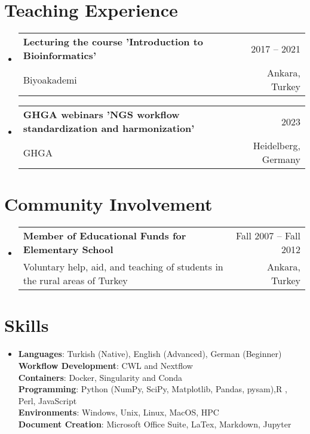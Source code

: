 \documentclass[A4,11pt]{article}
\makeatletter
\newcommand{\CVSubheading}[4]{
  \vspace{-2pt}\item
    \begin{tabular*}{0.97\textwidth}[t]{l@{\extracolsep{\fill}}r}
      \textbf{#1} & #2 \\
      \small#3 & \small #4 \\
    \end{tabular*}\vspace{-7pt}
}
\newcommand{\CVSubHeadingListStart}{\begin{itemize}[leftmargin=0.5cm, label={}]}
\newcommand{\CVSubHeadingListEnd}{\end{itemize}}
\makeatother
\begin{document}
\begin{comment}
Section is here as it applied to my application for positions in academia. 
Remember to tailor the resume for to the position.
\end{comment}

\section{Teaching Experience}
  \CVSubHeadingListStart
    \CVSubheading
      {Lecturing the course 'Introduction to Bioinformatics'}{2017 -- 2021}
      {Biyoakademi}{Ankara, Turkey}
    \CVSubheading
      {GHGA webinars 'NGS workflow standardization and harmonization'}{2023}
      {GHGA}{Heidelberg, Germany}
  \CVSubHeadingListEnd

\section{Community Involvement}
  \CVSubHeadingListStart
    \CVSubheading
      {Member of Educational Funds for Elementary School}{Fall 2007 -- Fall 2012}
      {Voluntary help, aid, and teaching of students in the rural areas of Turkey}{Ankara, Turkey}
  \CVSubHeadingListEnd

\begin{comment}
This section is compressed from the various skills sections that Euro CV
recommends.
\end{comment}

\section{Skills}
 \begin{itemize}[leftmargin=0.5cm, label={}]
    \item{
     \textbf{Languages}{: Turkish (Native), English (Advanced), German (Beginner)} \\
    \textbf{Workflow Development}{: CWL and Nextflow} \\
    \textbf{Containers}{: Docker, Singularity and Conda} \\
    \textbf{Programming}{: Python (NumPy, SciPy, Matplotlib, Pandas, pysam),R , Perl, JavaScript} \\  
     \textbf{Environments}{: Windows, Unix, Linux, MacOS, HPC} \\
     \textbf{Document Creation}{: Microsoft Office Suite, LaTex, Markdown, Jupyter} \\
     
    }
 \end{itemize}
    
\end{document}
